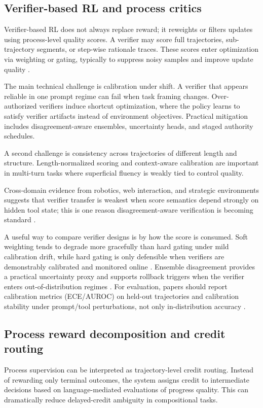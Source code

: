 ﻿\documentclass[conference]{IEEEtran}
\begin{document}
\subsection{Verifier-based RL and process critics}
Verifier-based RL does not always replace reward; it reweights or filters updates using process-level quality scores. A verifier may score full trajectories, sub-trajectory segments, or step-wise rationale traces. These scores enter optimization via weighting or gating, typically to suppress noisy samples and improve update quality \cite{arxiv_p_2602_06493,arxiv_p_2602_12579,arxiv_p_2601_06845,arxiv_p_2602_02395}.

The main technical challenge is calibration under shift. A verifier that appears reliable in one prompt regime can fail when task framing changes. Over-authorized verifiers induce shortcut optimization, where the policy learns to satisfy verifier artifacts instead of environment objectives. Practical mitigation includes disagreement-aware ensembles, uncertainty heads, and staged authority schedules.

A second challenge is consistency across trajectories of different length and structure. Length-normalized scoring and context-aware calibration are important in multi-turn tasks where superficial fluency is weakly tied to control quality.

Cross-domain evidence from robotics, web interaction, and strategic environments suggests that verifier transfer is weakest when score semantics depend strongly on hidden tool state; this is one reason disagreement-aware verification is becoming standard \cite{arxiv_p_2404_03648,arxiv_p_2601_02439,arxiv_p_2602_14234}.

A useful way to compare verifier designs is by how the score is consumed. Soft weighting tends to degrade more gracefully than hard gating under mild calibration drift, while hard gating is only defensible when verifiers are demonstrably calibrated and monitored online \cite{arxiv_p_2602_06493,arxiv_p_2602_12579}. Ensemble disagreement provides a practical uncertainty proxy and supports rollback triggers when the verifier enters out-of-distribution regimes \cite{arxiv_p_2602_02395,arxiv_p_2508_03680}. For evaluation, papers should report calibration metrics (ECE/AUROC) on held-out trajectories and calibration stability under prompt/tool perturbations, not only in-distribution accuracy \cite{arxiv_p_2602_06493,arxiv_p_2510_16720,arxiv_p_2411_02337}.

\subsection{Process reward decomposition and credit routing}
Process supervision can be interpreted as trajectory-level credit routing. Instead of rewarding only terminal outcomes, the system assigns credit to intermediate decisions based on language-mediated evaluations of progress quality. This can dramatically reduce delayed-credit ambiguity in compositional tasks.
\end{document}
